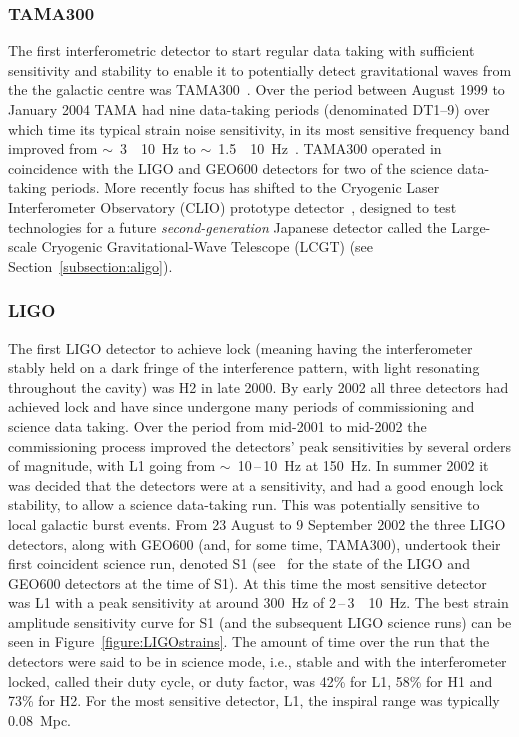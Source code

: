\documentclass{article}
\newcommand{\Hz}{Hz\super{-1/2}\xspace}
\begin{document}
\subsubsection{TAMA300}

The first interferometric detector to start regular data taking with sufficient
sensitivity and stability to enable it to potentially detect gravitational waves
from the the galactic centre was TAMA300~\cite{Ando:2001}. Over the period
between August 1999 to January 2004 TAMA had nine data-taking periods
(denominated DT1--9) over which time its typical strain noise sensitivity, in
its most sensitive frequency band improved from
$\sim$~3~\texttimes~10~\Hz to
$\sim$~1.5~\texttimes~10~\Hz~\cite{Akutsu:2006}. TAMA300
operated in coincidence with the LIGO and GEO600 detectors for two of
the science data-taking periods. More recently focus has shifted to
the Cryogenic Laser Interferometer Observatory (CLIO) prototype
detector~\cite{Yamamoto:2008, CLIOweb}, designed to test technologies
for a future \textit{second-generation} Japanese detector called the
Large-scale Cryogenic Gravitational-Wave Telescope (LCGT) (see
Section~\ref{subsection:aligo}).


\subsubsection{LIGO}
\label{sec:ligoruns}

The first LIGO detector to achieve lock (meaning having the interferometer
stably held on a dark fringe of the interference pattern, with light resonating
throughout the cavity) was H2 in late 2000. By early 2002 all three detectors
had achieved lock and have since undergone many periods of commissioning and
science data taking. Over the period from mid-2001 to mid-2002 the
commissioning process improved the detectors' peak sensitivities by several
orders of magnitude, with L1 going from
$\sim$~10\,--\,10~\Hz at 150~Hz. In summer 2002
it was decided that the detectors were at a sensitivity, and had a
good enough lock stability, to allow a science data-taking run. This
was potentially sensitive to local galactic burst events. From 23
August to 9 September 2002 the three LIGO detectors, along with GEO600
(and, for some time, TAMA300), undertook their first coincident
science run, denoted S1 (see~\cite{Abbott:2004a} for the state of the
LIGO and GEO600 detectors at the time of S1). At this time the most
sensitive detector was L1 with a peak sensitivity at around 300~Hz of
2\,--\,3~\texttimes~10~\Hz. The best strain
amplitude sensitivity curve for S1 (and the subsequent LIGO science runs) can be seen in
Figure~\ref{figure:LIGOstrains}. The amount of time over the run that
the detectors were said to be in science mode, i.e., stable and with
the interferometer locked, called their duty cycle, or duty factor,
was 42\% for L1, 58\% for H1 and 73\% for H2. For the most sensitive
detector, L1, the inspiral range was typically 0.08~Mpc.
\end{document}
